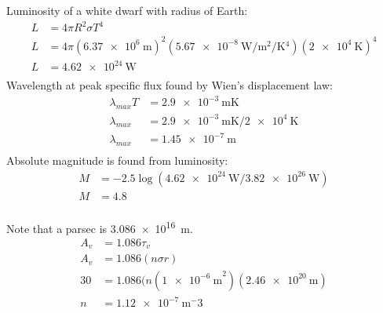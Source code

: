 \documentclass[newpage]{homework}
\begin{document}
\question
\begin{alphaparts}
	\questionpart Luminosity of a white dwarf with radius of Earth:
	\begin{align*}
		L	&=	4\pi R^2 \sigma T^4	\\
		L	&=	4\pi (\SI{6.37e6}{\metre})^2 (\SI{5.67e-8}{\watt\per\metre^2\per\kelvin^4}) (\SI{2e4}{\kelvin})^4	\\
		L	&=	\boxed{\SI{4.62e24}{\watt}}	\\
	\end{align*}
	\questionpart Wavelength at peak specific flux found by Wien's displacement law:
	\begin{align*}
		\lambda_{max} T	&=	\SI{2.9e-3}{\metre\kelvin}	\\
		\lambda_{max}	&=	\SI{2.9e-3}{\metre\kelvin}	/	\SI{2e4}{\kelvin}	\\
		\lambda_{max}	&=	\boxed{\SI{1.45e-7}{\metre}}	\\
	\end{align*}
	\questionpart Absolute magnitude is found from luminosity:
	\begin{align*}
		M	&=	-2.5 \log (\SI{4.62e24}{\watt}/\SI{3.82e26}{\watt})	\\
		M	&=	\boxed{4.8}	\\
	\end{align*}
\end{alphaparts}


\question
Note that a parsec is \SI{3.086e16}{\metre}.
\begin{align*}
	A_v	&=	1.086\tau_v	\\
	A_v	&=	1.086(n \sigma r)	\\
	30	&=	1.086(n (\SI{1e-6}{\metre}^2) (\SI{2.46e20}{\metre})	\\
	n	&=	\boxed{\SI{1.12e-7}{\metre^-3}}	\\
\end{align*}
\end{document}
